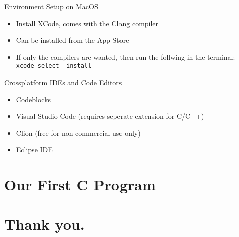 \documentclass[12pt, aspectratio=169]{beamer}
\begin{document}
    \begin{frame}{Environment Setup on MacOS}
        \begin{itemize}
            \item Install XCode, comes with the Clang compiler
            \item Can be installed from the App Store
            \item If only the compilers are wanted, then run the follwing in the terminal: \texttt{xcode-select~--install}
        \end{itemize}
    \end{frame}

    \begin{frame}{Crossplatform IDEs and Code Editors}
        \begin{itemize}
            \item Codeblocks
            \item Visual Studio Code (requires seperate extension for C/C++)
            \item Clion (free for non-commercial use only)
            \item Eclipse IDE
        \end{itemize}
    \end{frame}

    \section{Our First C Program}


    \section*{Thank you.}



\end{document}
